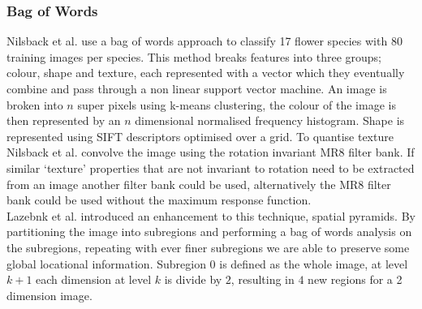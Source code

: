 \documentclass[11pt, titlepage, oneside]{article}
\theoremstyle{plain}
\theoremstyle{definition}
\theoremstyle{remark}
\begin{document}
		\subsubsection{Bag of Words}
			Nilsback et al\cite{vis}. use a bag of words approach to classify 17 flower species with 80 training images per species. This method breaks features into three groups; colour, shape and texture, each represented with a vector which they eventually combine and pass through a non linear support vector machine. An image is broken into $n$ super pixels using k-means clustering, the colour of the image is then represented by an $n$ dimensional normalised frequency histogram. Shape is represented using SIFT\cite{sift} descriptors optimised over a grid. To quantise texture Nilsback et al. convolve the image using the rotation invariant MR8 filter bank\cite{mr8}. If similar `texture' properties that are not invariant to rotation need to be extracted from an image another filter bank could be used, alternatively the MR8 filter bank could be used without the maximum response function. \\
			
			\noindent Lazebnk et al\cite{pyramid}. introduced an enhancement to this technique, spatial pyramids. By partitioning the image into subregions and performing a bag of words analysis on the subregions, repeating with ever finer subregions we are able to preserve some global locational information. Subregion $0$ is defined as the whole image, at level $k+1$ each dimension at level $k$ is divide by $2$, resulting in $4$ new regions for a 2 dimension image. 
\end{document}
